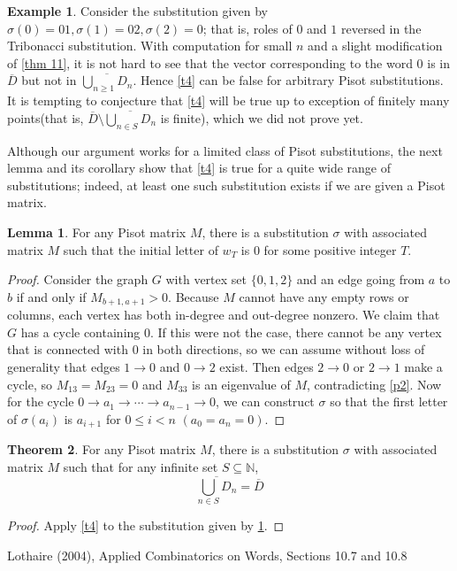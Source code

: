\documentclass{article}
\theoremstyle{definition}
\newtheorem{theorem}{Theorem}
\newtheorem{lemma}[theorem]{Lemma}
\newtheorem*{example}{Example}
\begin{document}
\begin{example}
Consider the substitution given by $\sigma(0)=01, \sigma(1)=02, \sigma(2)=0$; that is, roles of $0$ and $1$ reversed in the Tribonacci substitution. With computation for small $n$ and a slight modification of \cref{thm 11}, it is not hard to see that the vector corresponding to the word $0$ is in $\overline{D}$ but not in $\overline{\bigcup_{n\geq1}D_n}$. Hence \cref{t4} can be false for arbitrary Pisot substitutions. It is tempting to conjecture that \cref{t4} will be true up to exception of finitely many points(that is, $\overline{D}\setminus\overline{\bigcup_{n\in S}D_n}$ is finite), which we did not prove yet.
\end{example}
Although our argument works for a limited class of Pisot substitutions, the next lemma and its corollary show that \cref{t4} is true for a quite wide range of substitutions; indeed, at least one such substitution exists if we are given a Pisot matrix.
\begin{lemma}
\label{l5}
For any Pisot matrix $M$, there is a substitution $\sigma$ with associated matrix $M$ such that the initial letter of $w_T$ is $0$ for some positive integer $T$.
\end{lemma}
\begin{proof}
Consider the graph $G$ with vertex set $\{0,1,2\}$ and an edge going from $a$ to $b$ if and only if $M_{b+1, a+1}>0$. Because $M$ cannot have any empty rows or columns, each vertex has both in-degree and out-degree nonzero. We claim that $G$ has a cycle containing $0$. If this were not the case, there cannot be any vertex that is connected with $0$ in both directions, so we can assume without loss of generality that edges $1\rightarrow0$ and $0\rightarrow 2$ exist. Then edges $2\rightarrow0$ or $2\rightarrow 1$ make a cycle, so $M_{13}=M_{23}=0$ and $M_{33}$ is an eigenvalue of $M$, contradicting \cref{p2}. Now for the cycle $0\rightarrow a_1\rightarrow\cdots\rightarrow a_{n-1}\rightarrow 0$, we can construct $\sigma$ so that the first letter of $\sigma(a_i)$ is $a_{i+1}$ for $0\leq i<n$ $(a_0=a_n=0)$.
\end{proof}

\begin{theorem}
\label{t5}
For any Pisot matrix $M$, there is a substitution $\sigma$ with associated matrix $M$ such that for any infinite set $S\subseteq\mathbb{N}$,
\[
\overline{\bigcup_{n\in S}D_n}=\overline{D}
\]
\end{theorem}
\begin{proof}
Apply \cref{t4} to the substitution given by \cref{l5}.
\end{proof}
\begin{thebibliography}{9}
Lothaire (2004), Applied Combinatorics on Words, Sections 10.7 and 10.8
\end{thebibliography}
\end{document}
